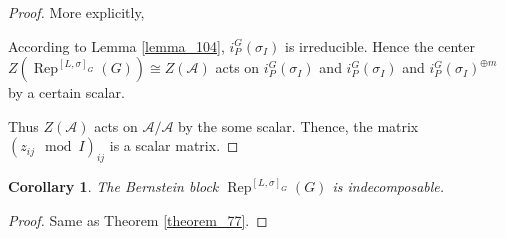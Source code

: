 \documentclass[8pt]{article}
\newtheorem{corollary}{Corollary} [section]
\DeclareMathOperator{\Rep}{Rep}
\newcommand{\cA}{\mathcal{A}}
\newcommand{\cB}{\mathcal{B}}
\newcommand{\tens}[1]{%
  \mathbin{\mathop{\otimes}\displaylimits_{#1}}%
}
\begin{document}
\begin{proof}
  More explicitly,
  \begin{center}
  \end{center}
  According to Lemma \ref{lemma_104}, $i_P^G(\sigma_I)$ is irreducible. Hence the center $Z(\Rep^{[L,\sigma]_G}(G))\cong Z(\cA)$ acts on $i_P^G(\sigma_I)$ and $i_P^G(\sigma_I)$ and $i_P^G(\sigma_I)^{\oplus m}$ by a certain scalar.
  \par Thus $Z(\cA)$ acts on $\cA/\cA$ by the some scalar. Thence, the matrix $(z_{ij}\mod I)_{ij}$ is a scalar matrix.
\end{proof}
\begin{corollary}
  \label{corollary_114}The Bernstein block $\Rep^{[L,\sigma]_G}(G)$ is indecomposable.
\end{corollary}
\begin{proof}
Same as Theorem \ref{theorem_77}.
\end{proof}
\end{document}
